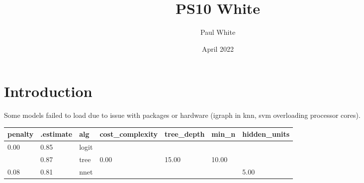\documentclass{article}
\title{PS10 White}
\author{Paul White}
\date{April 2022}
\begin{document}
\maketitle

\section{Introduction}

Some models failed to load due to issue with packages or hardware (igraph in knn, svm overloading processor cores).

\begin{table}
\centering
\begin{tabular}[t]{lllllll}
\toprule
penalty & .estimate & alg & cost_complexity & tree_depth & min_n & hidden_units\\
\midrule
0.00 & 0.85 & logit &  &  &  & \\
 & 0.87 & tree & 0.00 & 15.00 & 10.00 & \\
0.08 & 0.81 & nnet &  &  &  & 5.00\\
\bottomrule
\end{tabular}
\end{table}
\end{document}
